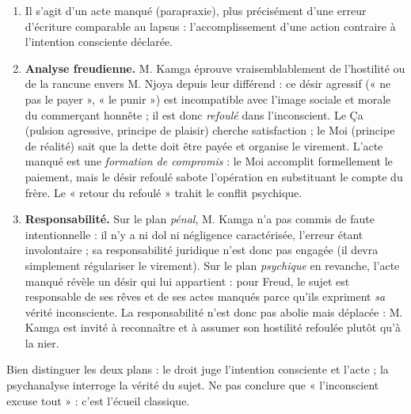 \documentclass[11pt]{article}
\newcommand{\cle}[1]{{\popxbold\color{popdark}#1}}
\begin{document}
\begin{corrige}
\begin{enumerate}
\item Il s'agit d'un \cle{acte manqué} (parapraxie), plus précisément d'une erreur d'écriture comparable au lapsus : l'accomplissement d'une action contraire à l'intention consciente déclarée.
\item \textbf{Analyse freudienne.} M. Kamga éprouve vraisemblablement de l'hostilité ou de la rancune envers M. Njoya depuis leur différend : ce désir agressif (« ne pas le payer », « le punir ») est incompatible avec l'image sociale et morale du commerçant honnête ; il est donc \emph{refoulé} dans l'inconscient. Le \cle{Ça} (pulsion agressive, principe de plaisir) cherche satisfaction ; le \cle{Moi} (principe de réalité) sait que la dette doit être payée et organise le virement. L'acte manqué est une \emph{formation de compromis} : le Moi accomplit formellement le paiement, mais le désir refoulé sabote l'opération en substituant le compte du frère. Le « retour du refoulé » trahit le conflit psychique.
\item \textbf{Responsabilité.} Sur le plan \emph{pénal}, M. Kamga n'a pas commis de faute intentionnelle : il n'y a ni dol ni négligence caractérisée, l'erreur étant involontaire ; sa responsabilité juridique n'est donc pas engagée (il devra simplement régulariser le virement). Sur le plan \emph{psychique} en revanche, l'acte manqué révèle un désir qui lui appartient : pour Freud, le sujet est responsable de ses rêves et de ses actes manqués parce qu'ils expriment \emph{sa} vérité inconsciente. La responsabilité n'est donc pas abolie mais déplacée : M. Kamga est invité à reconnaître et à assumer son hostilité refoulée plutôt qu'à la nier.
\end{enumerate}
\end{corrige}

\begin{attention}
Bien distinguer les deux plans : le droit juge l'intention consciente et l'acte ; la psychanalyse interroge la vérité du sujet. Ne pas conclure que « l'inconscient excuse tout » : c'est l'écueil classique.
\end{attention}
\end{document}
